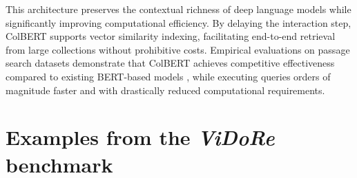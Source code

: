 \documentclass{article} %
\begin{document}
This architecture preserves the contextual richness of deep language models while significantly improving computational efficiency. By delaying the interaction step, ColBERT supports vector similarity indexing, facilitating end-to-end retrieval from large collections without prohibitive costs. Empirical evaluations on passage search datasets demonstrate that ColBERT achieves competitive effectiveness compared to existing BERT-based models \citep{devlin_bert_2018}, while executing queries orders of magnitude faster and with drastically reduced computational requirements.


\newpage
\section{Examples from the \textit{ViDoRe} benchmark}
\label{subsection:docvisbenchmark_examples}

\vspace*{3\baselineskip}
\end{document}
